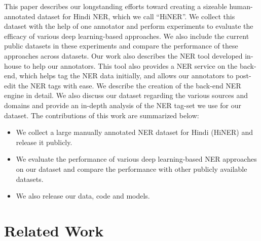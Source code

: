 \documentclass[10pt, a4paper]{article}
\begin{document}
This paper describes our longstanding efforts toward creating a sizeable human-annotated dataset for Hindi NER, which we call ``HiNER''. We collect this dataset with the help of one annotator and perform experiments to evaluate the efficacy of various deep learning-based approaches. We also include the current public datasets in these experiments and compare the performance of these approaches across datasets. Our work also describes the NER tool developed in-house to help our annotators. This tool also provides a NER service on the back-end, which helps tag the NER data initially, and allows our annotators to post-edit the NER tags with ease. We describe the creation of the back-end NER engine in detail. We also discuss our dataset regarding the various sources and domains and provide an in-depth analysis of the NER tag-set we use for our dataset. The contributions of this work are summarized below:
\begin{itemize}
    \item We collect a large manually annotated NER dataset for Hindi (HiNER) and release it publicly.
    \item We evaluate the performance of various deep learning-based NER approaches on our dataset and compare the performance with other publicly available datasets.
    \item We also release our data, code and models.
\end{itemize}

%
 \section{Related Work}
\end{document}
